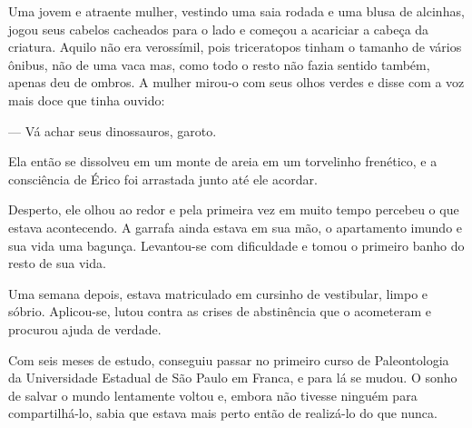 Uma jovem e atraente mulher, vestindo uma saia rodada e uma blusa de
alcinhas, jogou seus cabelos cacheados para o lado e começou a acariciar
a cabeça da criatura. Aquilo não era verossímil, pois triceratopos
tinham o tamanho de vários ônibus, não de uma vaca mas, como todo o
resto não fazia sentido também, apenas deu de ombros. A mulher mirou-o
com seus olhos verdes e disse com a voz mais doce que tinha ouvido:

--- Vá achar seus dinossauros, garoto.

Ela então se dissolveu em um monte de areia em um torvelinho frenético,
e a consciência de Érico foi arrastada junto até ele acordar.

Desperto, ele olhou ao redor e pela primeira vez em muito tempo percebeu
o que estava acontecendo. A garrafa ainda estava em sua mão, o
apartamento imundo e sua vida uma bagunça. Levantou-se com dificuldade e
tomou o primeiro banho do resto de sua vida.

Uma semana depois, estava matriculado em cursinho de vestibular, limpo e
sóbrio. Aplicou-se, lutou contra as crises de abstinência que o
acometeram e procurou ajuda de verdade.

Com seis meses de estudo, conseguiu passar no primeiro curso de
Paleontologia da Universidade Estadual de São Paulo em Franca, e para lá
se mudou. O sonho de salvar o mundo lentamente voltou e, embora não
tivesse ninguém para compartilhá-lo, sabia que estava mais perto então
de realizá-lo do que nunca.
